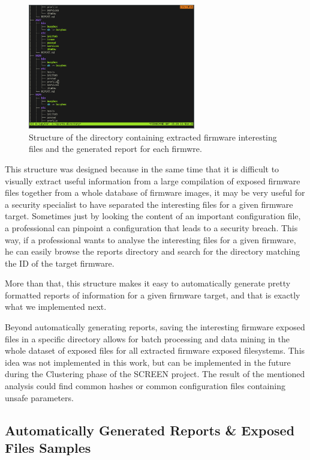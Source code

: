 \begin{figure}[H]
    \centering
    \includegraphics[width=0.65\textwidth]{figs/tree.png}
    \caption{Structure of the directory containing extracted firmware interesting files and the generated report for each firmwre.}
    \label{fig:reports-directory}
\end{figure}

This structure was designed because in the same time that it is difficult to visually extract useful information from a large compilation of exposed firmware files together from a whole database of firmware images, it may be very useful for a security specialist to have separated the interesting files for a given firmware target. Sometimes just by looking the content of an important configuration file, a professional can pinpoint a configuration that leads to a security breach. This way, if a professional wants to analyse the interesting files for a given firmware, he can easily browse the reports directory and search for the directory matching the ID of the target firmware.

More than that, this structure makes it easy to automatically generate pretty formatted reports of information for a given firmware target, and that is exactly what we implemented next.

Beyond automatically generating reports, saving the interesting firmware exposed files in a specific directory allows for batch processing and data mining in the whole dataset of exposed files for all extracted firmware exposed filesystems. This idea was not implemented in this work, but can be implemented in the future during the Clustering phase of the SCREEN project. The result of the mentioned analysis could find common hashes or common configuration files containing unsafe parameters.

\subsection{Automatically Generated Reports \& Exposed Files Samples}
\label{sec:auto-reports}

